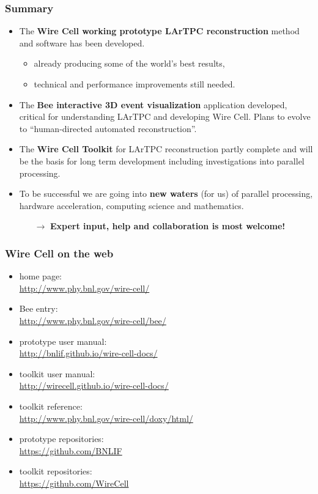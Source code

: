 \documentclass[xcolor=dvipsnames]{beamer}
\begin{document}
\begin{frame}
  \frametitle{Summary}
  \footnotesize
  \begin{itemize}
  \item The \textbf{Wire Cell working prototype LArTPC reconstruction} method and software has been developed.
    \begin{itemize}
    \item already producing some of the world's best results,
    \item technical and performance improvements still needed.
    \end{itemize}
  \item The \textbf{Bee interactive 3D event visualization}
    application developed, critical for understanding LArTPC and
    developing Wire Cell.  Plans to evolve to ``human-directed
    automated reconstruction''.
  \item The \textbf{Wire Cell Toolkit} for LArTPC reconstruction
    partly complete and will be the basis for long term development
    including investigations into parallel processing.
  \item To be successful we are going into \textbf{new waters} (for
    us) of parallel processing, hardware acceleration, computing
    science and mathematics.
    \begin{itemize}
    \item[$\rightarrow$] \textbf{Expert input, help and collaboration is most welcome!}
    \end{itemize}
  \end{itemize}
\end{frame}

\begin{frame}
  \frametitle{Wire Cell on the web}

  \begin{itemize}
  \item home page: \\ \url{http://www.phy.bnl.gov/wire-cell/}
  \item Bee entry: \\ \url{http://www.phy.bnl.gov/wire-cell/bee/}
  \item prototype user manual: \\ \url{http://bnlif.github.io/wire-cell-docs/}
  \item toolkit user manual: \\ \url{http://wirecell.github.io/wire-cell-docs/}
  \item toolkit reference: \\ \url{http://www.phy.bnl.gov/wire-cell/doxy/html/}
  \item prototype repositories: \\ \url{https://github.com/BNLIF}
  \item toolkit repositories: \\ \url{https://github.com/WireCell}
  \end{itemize}
\end{frame}
\end{document}
